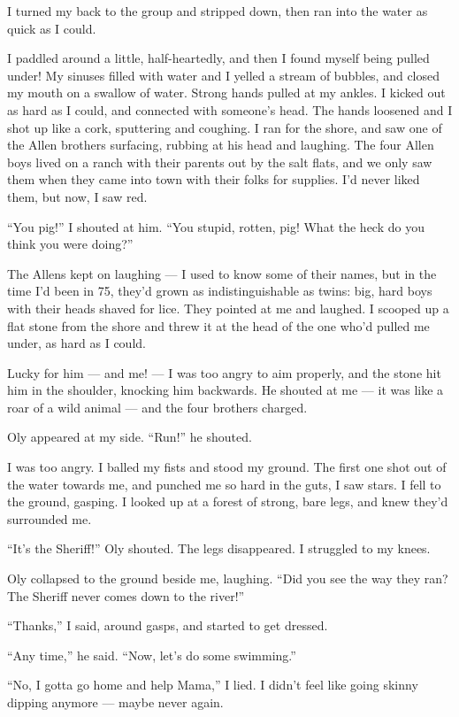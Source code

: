 I turned my back to the group and stripped down, then ran into the
water as quick as I could.

I paddled around a little, half-heartedly, and then I found myself
being pulled under! My sinuses filled with water and I yelled a
stream of bubbles, and closed my mouth on a swallow of water.
Strong hands pulled at my ankles. I kicked out as hard as I could,
and connected with someone's head. The hands loosened and I shot up
like a cork, sputtering and coughing. I ran for the shore, and saw
one of the Allen brothers surfacing, rubbing at his head and
laughing. The four Allen boys lived on a ranch with their parents
out by the salt flats, and we only saw them when they came into
town with their folks for supplies. I'd never liked them, but now,
I saw red.

``You pig!'' I shouted at him.
``You stupid, rotten, pig! What the heck do you think you were doing?''

The Allens kept on laughing --- I used to know some of their names,
but in the time I'd been in 75, they'd grown as indistinguishable
as twins: big, hard boys with their heads shaved for lice. They
pointed at me and laughed. I scooped up a flat stone from the shore
and threw it at the head of the one who'd pulled me under, as hard
as I could.

Lucky for him --- and me! --- I was too angry to aim properly, and
the stone hit him in the shoulder, knocking him backwards. He
shouted at me --- it was like a roar of a wild animal --- and the
four brothers charged.

Oly appeared at my side. ``Run!'' he shouted.

I was too angry. I balled my fists and stood my ground. The first
one shot out of the water towards me, and punched me so hard in the
guts, I saw stars. I fell to the ground, gasping. I looked up at a
forest of strong, bare legs, and knew they'd surrounded me.

``It's the Sheriff!'' Oly shouted. The legs disappeared. I
struggled to my knees.

Oly collapsed to the ground beside me, laughing.
``Did you see the way they ran? The Sheriff never comes down to the river!''

``Thanks,'' I said, around gasps, and started to get dressed.

``Any time,'' he said. ``Now, let's do some swimming.''

``No, I gotta go home and help Mama,'' I lied. I didn't feel like
going skinny dipping anymore --- maybe never again.

